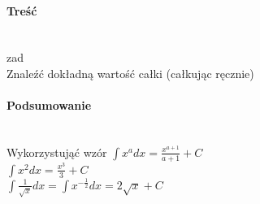 \paragraph{Treść}~\\
{zad}\\
Znaleźć dokładną wartość całki (całkując ręcznie)

\paragraph{Podsumowanie}~\\
Wykorzystująć wzór $ \int x^a dx = \frac{x^{a+1}}{a+1} + C $\\
$ \int x^2 dx = \frac{x^3}{3} + C $\\
$ \int \frac{1}{\sqrt{x}} dx = \int x^{-\frac{1}{2}} dx = 2\sqrt{x} + C $
